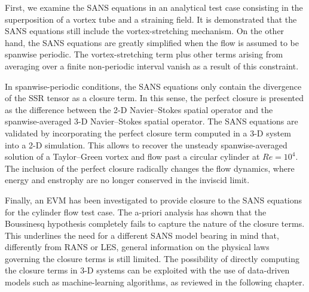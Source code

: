 \documentclass[../main.tex]{subfiles}
\begin{document}
First, we examine the SANS equations in an analytical test case consisting in the superposition of a vortex tube and a straining field.
It is demonstrated that the SANS equations still include the vortex-stretching mechanism.
On the other hand, the SANS equations are greatly simplified when the flow is assumed to be spanwise periodic.
The vortex-stretching term plus other terms arising from averaging over a finite non-periodic interval vanish as a result of this constraint.

In spanwise-periodic conditions, the SANS equations only contain the divergence of the SSR tensor as a closure term.
In this sense, the perfect closure is presented as the difference between the 2-D Navier--Stokes spatial operator and the spanwise-averaged 3-D Navier--Stokes spatial operator.
The SANS equations are validated by incorporating the perfect closure term computed in a 3-D system into a 2-D simulation.
This allows to recover the unsteady spanwise-averaged solution of a Taylor--Green vortex and flow past a circular cylinder at $Re=10^4$.
The inclusion of the perfect closure radically changes the flow dynamics, where energy and enstrophy are no longer conserved in the inviscid limit.

Finally, an EVM has been investigated to provide closure to the SANS equations for the cylinder flow test case.
The a-priori analysis has shown that the Boussinesq hypothesis completely fails to capture the nature of the closure terms.
This underlines the need for a different SANS model bearing in mind that, differently from RANS or LES, general information on the physical laws governing the closure terms is still limited.
The possibility of directly computing the closure terms in 3-D systems can be exploited with the use of data-driven models such as machine-learning algorithms, as reviewed in the following chapter.
\end{document}
